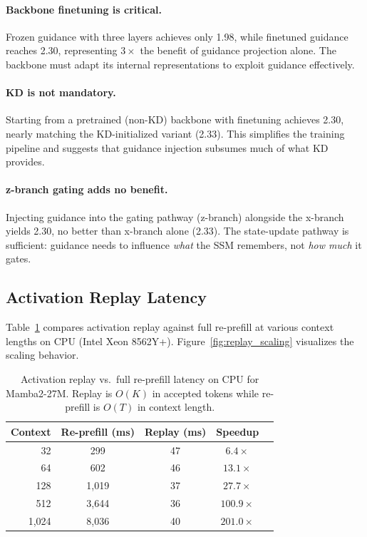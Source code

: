 \paragraph{Backbone finetuning is critical.}
Frozen guidance with three layers achieves only 1.98, while finetuned guidance reaches 2.30, representing $3\times$ the benefit of guidance projection alone.
The backbone must adapt its internal representations to exploit guidance effectively.

\paragraph{KD is not mandatory.}
Starting from a pretrained (non-KD) backbone with finetuning achieves 2.30, nearly matching the KD-initialized variant (2.33).
This simplifies the training pipeline and suggests that guidance injection subsumes much of what KD provides.

\paragraph{z-branch gating adds no benefit.}
Injecting guidance into the gating pathway (z-branch) alongside the x-branch yields 2.30, no better than x-branch alone (2.33).
The state-update pathway is sufficient: guidance needs to influence \emph{what} the SSM remembers, not \emph{how much} it gates.

\subsection{Activation Replay Latency}
\label{sec:replay_results}

Table~\ref{tab:replay} compares activation replay against full re-prefill at various context lengths on CPU (Intel Xeon 8562Y+).
Figure~\ref{fig:replay_scaling} visualizes the scaling behavior.

\begin{table}[t]
\centering
\caption{Activation replay vs.\ full re-prefill latency on CPU for Mamba2-27M. Replay is $O(K)$ in accepted tokens while re-prefill is $O(T)$ in context length.}
\label{tab:replay}
\vspace{0.5em}
\begin{tabular}{@{}rcccc@{}}
\toprule
\textbf{Context} & \textbf{Re-prefill (ms)} & \textbf{Replay (ms)} & \textbf{Speedup} \\
\midrule
32    & 299   & 47 & $6.4\times$ \\
64    & 602   & 46 & $13.1\times$ \\
128   & 1,019 & 37 & $27.7\times$ \\
512   & 3,644 & 36 & $100.9\times$ \\
1,024 & 8,036 & 40 & $201.0\times$ \\
\bottomrule
\end{tabular}
\end{table}

